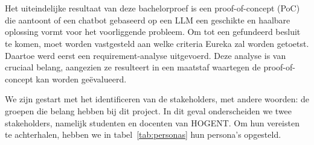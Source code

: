 
\chapter{}%
\label{ch:methodologie}



\subsection{}%
\label{subsec:requirement-analyse}

Het uiteindelijke resultaat van deze bachelorproef is een proof-of-concept (PoC) die aantoont of een chatbot gebaseerd op een \acrshort{LLM} een geschikte en haalbare oplossing vormt voor het voorliggende probleem. Om tot een gefundeerd besluit te komen, moet worden vastgesteld aan welke criteria Eureka zal worden getoetst. Daartoe werd eerst een requirement-analyse uitgevoerd. Deze analyse is van cruciaal belang, aangezien ze resulteert in een maatstaf waartegen de proof-of-concept kan worden geëvalueerd.

We zijn gestart met het identificeren van de stakeholders, met andere woorden: de groepen die belang hebben bij dit project. In dit geval onderscheiden we twee stakeholders, namelijk studenten en docenten van HOGENT. Om hun vereisten te achterhalen, hebben we in tabel~\ref{tab:personas} hun persona’s opgesteld.

